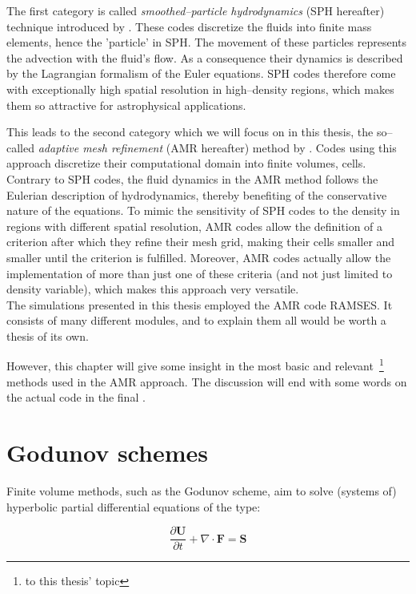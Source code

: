 The first category is called \textit{smoothed--particle hydrodynamics} (SPH hereafter) technique introduced by \citet{SPH_gingold_monaghan, SPH_lucy}.
These codes discretize the fluids into finite mass elements, hence the 'particle' in SPH.
The movement of these particles represents the advection with the fluid's flow.
As a consequence their dynamics is described by the Lagrangian formalism of the Euler equations.
SPH codes therefore come with exceptionally high spatial resolution in high--density regions, which makes them so attractive for astrophysical applications.

This leads to the second category which we will focus on in this thesis, the so--called \textit{adaptive mesh refinement} (AMR hereafter) method by \citet{AMR_colella}.
Codes using this approach discretize their computational domain into finite volumes, cells.
Contrary to SPH codes, the fluid dynamics in the AMR method follows the Eulerian description of hydrodynamics, thereby benefiting of the conservative nature of the equations.
To mimic the sensitivity of SPH codes to the density in regions with different spatial resolution, AMR codes allow the definition of a criterion after which they refine their mesh grid, making their cells smaller and smaller until the criterion is fulfilled.
Moreover, AMR codes actually allow the implementation of more than just one of these criteria (and not just limited to density variable), which makes this approach very versatile.
\\[6pt]
%
The simulations presented in this thesis employed the AMR code RAMSES.
It consists of many different modules, and to explain them all would be worth a thesis of its own.

However, this chapter will give some insight in the most basic and relevant~\footnote{to this thesis' topic} methods used in the AMR approach.
The discussion will end with some words on the actual code in the final .


\section{Godunov schemes}
\label{sec:Godunov}

Finite volume methods, such as the Godunov scheme, aim to solve (systems of) hyperbolic partial differential equations of the type:

\begin{equation}
  \frac{\partial\textbf{U}}{\partial t} + \nabla \cdot \textbf{F} = \textbf{S}
\label{eq:Conservation_law}
\end{equation}

